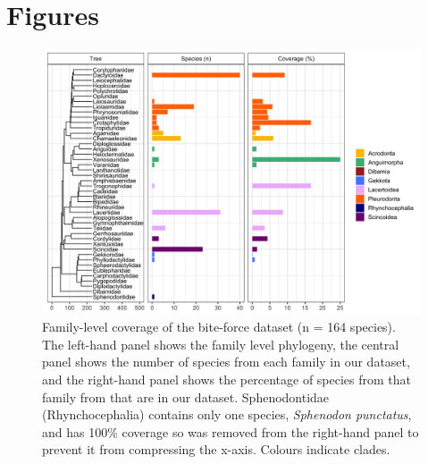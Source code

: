\documentclass[a4paper, 12pt]{article}
\begin{document}
\newpage
\section{Figures}


\begin{figure}[h]
 \centering
  \includegraphics[width = \linewidth]{figures/phylogeny-data-coverage-colours.png}
  \caption{Family-level coverage of the bite-force dataset (n = 164 species). 
  The left-hand panel shows the family level phylogeny, the central panel shows the number of species from each family in our dataset, and the right-hand panel shows the percentage of species from that family from \cite{uetz2020reptile} that are in our dataset. 
  Sphenodontidae (Rhynchocephalia) contains only one species, \textit{Sphenodon punctatus}, and has 100\% coverage so was removed from the right-hand panel to prevent it from compressing the x-axis. 
  Colours indicate clades.
}
  \label{fig-data-coverage}
\end{figure}
\end{document}
